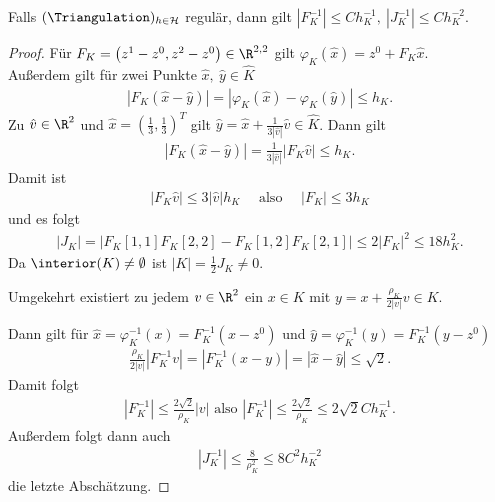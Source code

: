 \begin{Bemerkung}
    Falls $(\Triangulation)_{h\in\mathcal{H}}$ regulär, dann gilt
    $\left|F_K^{-1}\right| \le C h_K^{-1}, \
    \left|J_K^{-1}\right| \le C h_K^{-2}$.
\end{Bemerkung}


\begin{proof}
    Für $F_K = \left(z^1 - z^0, z^2 - z^0\right)\in \R^{2,2}$ gilt
    $\varphi_K(\hat x) = z^0 + F_K \hat x$. \\
    Au\ss{}erdem gilt für zwei Punkte $\hat x, \ \hat y \in \hat K$
    \begin{eqnarray*}
          |F_K(\hat x - \hat y)|
        = |\varphi_K(\hat x) - \varphi_K(\hat y)|
        \le h_K.
    \end{eqnarray*}
    Zu $\hat v \in \R^2$ und $\hat x = (\frac{1}{3}, \frac{1}{3})^T$ gilt
    $\hat y = \hat x + \frac{1}{3 |\hat v|} \hat v \in \hat K$.
    Dann gilt
    \begin{eqnarray*}
          |F_K(\hat x - \hat y)|
        = \frac{1}{3 |\hat v|} |F_K \hat v|
        \le h_K.
    \end{eqnarray*}
    Damit ist
    \begin{eqnarray*}
        |F_K \hat v| \le 3 |\hat v| h_K
        \quad \text{ also } \quad
        |F_K| \le 3 h_K
    \end{eqnarray*}
    und es folgt
    \begin{eqnarray*}
          |J_K|
        = |F_K[1,1] F_K[2,2] - F_K[1,2] F_K[2,1]|
        \le 2 |F_K|^2
        \le 18 h_K^2.
    \end{eqnarray*}
    Da $\interior(K) \neq \emptyset$ ist $|K| = \frac{1}{2} J_K \neq 0$.

    Umgekehrt existiert zu jedem $v \in \R^2$ ein $x \in K$ mit
    $y = x + \frac{\rho_K}{2 |v|} v \in K$.

    Dann gilt für
    $\hat x = \varphi_K^{-1}(x) = F_K^{-1}(x - z^0)$ und
    $\hat y = \varphi_K^{-1}(y) = F_K^{-1}(y - z^0)$
    \begin{eqnarray*}
        \frac{\rho_K}{2 |v|} |F_K^{-1} v| = |F_K^{-1}(x - y)| = |\hat x -
        \hat y| \le \sqrt{2}.
    \end{eqnarray*}
    Damit folgt
    \begin{eqnarray*}
        |F_K^{-1}| \le \frac{2 \sqrt{2}}{\rho_K} |v| \text{ also }
        |F_K^{-1}| \le \frac{2 \sqrt{2}}{\rho_K} \le 2 \sqrt{2} C h_K^{-1}.
    \end{eqnarray*}
    Außerdem folgt dann auch
    \begin{eqnarray*}
        |J_K^{-1}| \le \frac{8}{\rho_K^2} \le 8 C^2 h_K^{-2}
    \end{eqnarray*}
    die letzte Abschätzung.
\end{proof}


